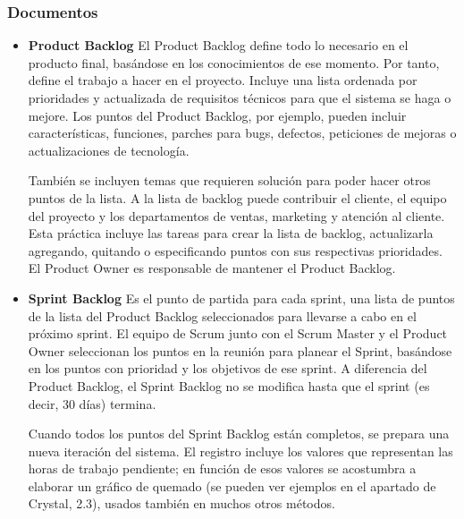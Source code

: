 \subsubsection{Documentos}
\begin{itemize}
\item \textbf{Product Backlog} El Product Backlog define todo lo necesario en el producto final, basándose en los conocimientos de ese momento. Por tanto, define el trabajo a hacer en el proyecto. Incluye una lista ordenada por prioridades y actualizada de requisitos técnicos para que el sistema se haga o mejore. Los puntos del Product Backlog, por ejemplo, pueden incluir características, funciones, parches para bugs, defectos, peticiones de mejoras o actualizaciones de tecnología.
 
También se incluyen temas que requieren solución para poder hacer otros puntos de la lista. A la lista de backlog puede contribuir el cliente, el equipo del proyecto y los departamentos de ventas, marketing y atención al cliente.
Esta práctica incluye las tareas para crear la lista de backlog, actualizarla agregando, quitando o especificando puntos con sus respectivas prioridades. El Product Owner es responsable de mantener el Product Backlog.

\item \textbf{Sprint Backlog} Es el punto de partida para cada sprint, una lista de puntos de la lista del Product Backlog seleccionados para llevarse a cabo en el próximo sprint. El equipo de Scrum junto con el Scrum Master y el Product Owner seleccionan los puntos en la reunión para planear el Sprint, basándose en los puntos con prioridad y los objetivos de ese sprint. A diferencia del Product Backlog, el Sprint Backlog no se modifica hasta que el sprint (es decir, 30 días) termina.
 
Cuando todos los puntos del Sprint Backlog están completos, se prepara una nueva iteración del sistema. El registro incluye los valores que representan las horas de trabajo pendiente; en función de esos valores se acostumbra a elaborar un gráfico de quemado (se pueden ver ejemplos en el apartado de Crystal, 2.3), usados también en muchos otros métodos.
\end{itemize}
